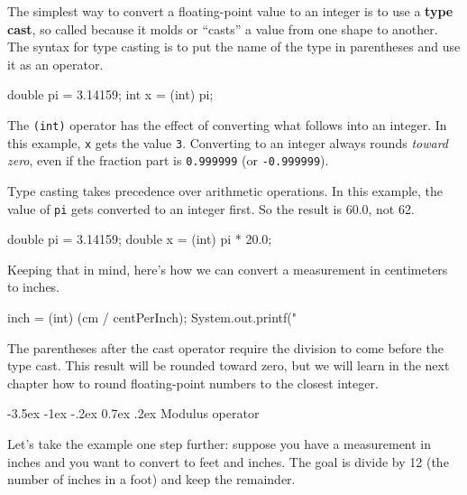 \documentclass[12pt]{book}
\makeatletter
\theoremstyle{exercise}
\newcommand{\java}[1]{\verb"#1"}
\renewcommand{\section}{\@startsection {section}{1}{\z@}%
    {-3.5ex \@plus -1ex \@minus -.2ex}%
    {0.7ex \@plus.2ex}%
    {\normalfont\Large\bfseries}}
\newcommand{\java}[1]{\lstinline{#1}} %
\makeatother
\begin{document}

The simplest way to convert a floating-point value to an integer is to use a {\bf type cast}, so called because it molds or ``casts'' a value from one shape to another.
The syntax for type casting is to put the name of the type in parentheses and use it as an operator.

\begin{code}
    double pi = 3.14159;
    int x = (int) pi;
\end{code}


The \java{(int)} operator has the effect of converting what follows into an integer.
In this example, \java{x} gets the value \java{3}.
Converting to an integer always rounds {\em toward zero}, even if the fraction part is \java{0.999999} (or \java{-0.999999}).

Type casting takes precedence over arithmetic operations.
In this example, the value of \java{pi} gets converted to an integer first.
So the result is 60.0, not 62.

\begin{code}
    double pi = 3.14159;
    double x = (int) pi * 20.0;
\end{code}


Keeping that in mind, here's how we can convert a measurement in centimeters to inches.

\begin{code}
    inch = (int) (cm / centPerInch);
    System.out.printf("%
\end{code}

The parentheses after the cast operator require the division to come before the type cast.
This result will be rounded toward zero, but we will learn in the next chapter how to round floating-point numbers to the closest integer.

\section{Modulus operator}

Let's take the example one step further: suppose you have a measurement in inches and you want to convert to feet and inches.
The goal is divide by 12 (the number of inches in a foot) and keep the remainder.

\end{document}
